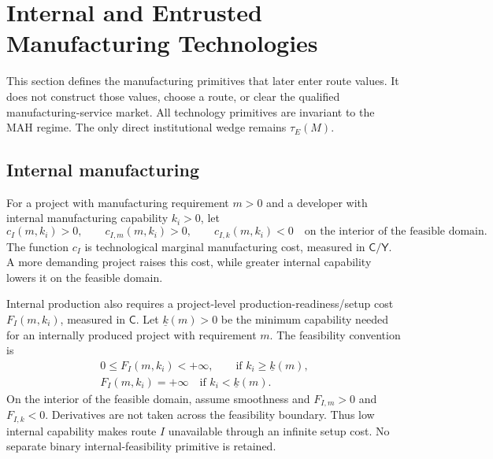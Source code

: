 \section{Internal and Entrusted Manufacturing Technologies}
\label{sec:p03-technologies}

This section defines the manufacturing primitives that later enter route
values. It does not construct those values, choose a route, or clear the
qualified manufacturing-service market. All technology primitives are
invariant to the MAH regime. The only direct institutional wedge remains
\(\tau_E(M)\).

\subsection{Internal manufacturing}
\label{subsec:p03-internal}

For a project with manufacturing requirement \(m>0\) and a developer with
internal manufacturing capability \(k_i>0\), let
\begin{equation}
  c_I(m,k_i)>0,
  \qquad
  c_{I,m}(m,k_i)>0,
  \qquad
  c_{I,k}(m,k_i)<0
  \quad\text{on the interior of the feasible domain}.
  \label{eq:p03-internal-cost}
\end{equation}
The function \(c_I\) is technological marginal manufacturing cost, measured
in \(\mathsf C/\mathsf Y\). A more demanding project raises this cost, while
greater internal capability lowers it on the feasible domain.

Internal production also requires a project-level production-readiness/setup
cost \(F_I(m,k_i)\), measured in \(\mathsf C\). Let
\(\underline{k}(m)>0\) be the minimum capability needed for an internally
produced project with requirement \(m\). The feasibility convention is
\begin{equation}
  \begin{gathered}
    0\leq F_I(m,k_i)<+\infty,\quad
    \quad\text{if }k_i\geq\underline{k}(m),\\
    F_I(m,k_i)=+\infty
    \quad\text{if }k_i<\underline{k}(m).
  \end{gathered}
  \label{eq:p03-internal-setup}
\end{equation}
On the interior of the feasible domain, assume smoothness and
\(F_{I,m}>0\) and \(F_{I,k}<0\). Derivatives are not taken across the
feasibility boundary. Thus low internal capability makes route \(I\) unavailable through an
infinite setup cost. No separate binary internal-feasibility primitive is
retained.

